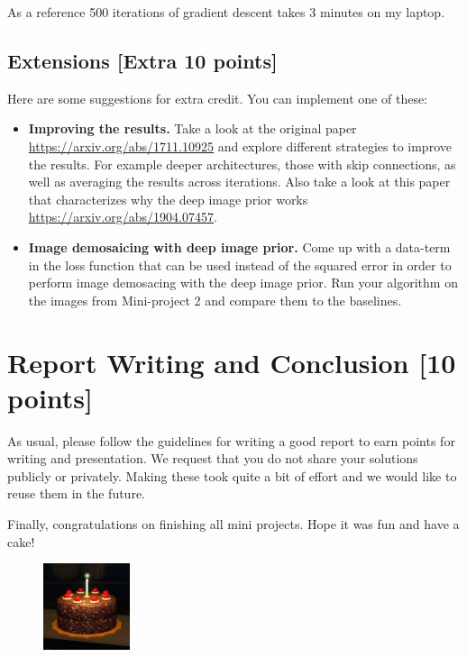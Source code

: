 \documentclass[10pt,letterpaper]{article}
\begin{document}
As a reference 500 iterations of gradient descent takes 3 minutes on my laptop.

\subsection{Extensions [Extra 10 points]}
Here are some suggestions for extra credit. You can implement one of these:

\begin{itemize}
\item \textbf{Improving the results.} Take a look at the original
  paper \url{https://arxiv.org/abs/1711.10925} and explore different
  strategies to improve the results. For example deeper architectures,
  those with skip connections, as well as averaging the results across
  iterations. Also take a look at this paper that characterizes why
  the deep image prior works \url{https://arxiv.org/abs/1904.07457}.


\item \textbf{Image demosaicing with deep image prior.} Come up with a data-term in the loss function that can be used instead of the squared error in order to perform image demosacing with the deep image prior. Run your algorithm on the images from Mini-project 2 and compare them to the baselines.
\end{itemize}


\section{Report Writing and Conclusion [10 points]}
As usual, please follow the guidelines for writing a good report to earn points for writing and presentation. We request that you do not share your solutions publicly or privately.
Making these took quite a bit of effort and we would like to reuse them in the future.

Finally, congratulations on finishing all mini projects. Hope it was fun and have a cake!
\begin{figure}[h]
\centering
\includegraphics[width=1in]{portal-cake.jpg}
\end{figure}
\end{document}
